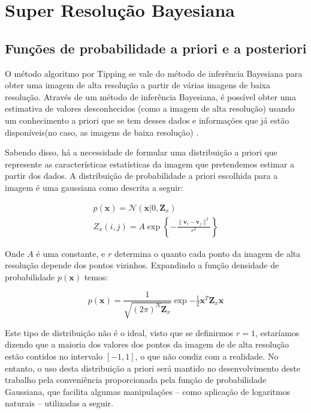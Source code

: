 \documentclass[12pt,openright,oneside,a4paper,english,brazil]{abntex2}
\begin{document}
\chapter{Super Resolução Bayesiana}
\section{Funções de probabilidade a priori e a posteriori}

O método algoritmo por Tipping se vale do método de inferência Bayesiana para obter uma imagem de alta resolução a partir de várias imagens de baixa resolução.
Através de um método de inferência Bayesiana, é possível obter uma estimativa de valores desconhecidos (como a imagem de alta resolução) usando um conhecimento a priori que se tem desses dados e informações que já estão disponíveis(no caso, as imagens de baixa resolução) \cite{therrien2011probability}.

Sabendo disso, há a necessidade de formular uma distribuição a priori que represente as características estatísticas da imagem que pretendemos estimar a partir dos dados.
A distribuição de probabilidade a priori escolhida para a imagem é uma gaussiana como descrita a seguir:

\begin{gather}
	p(\mathbf{x}) = \mathcal{N}(\mathbf{x} | 0, \mathbf{Z}_x) \\ 
	Z_x(i,j) = A \exp \left\{ - \frac{\|\mathbf{v}_i - \mathbf{v}_j \|^2}{r^2} \right\}
\end{gather}

Onde $A$ é uma constante, e $r$ determina o quanto cada ponto da imagem de alta resolução depende dos pontos vizinhos.
Expandindo a função densidade de probabilidade $p(\mathbf{x})$ temos:

\begin{equation}
	p(\mathbf{x}) = \frac{1}{\sqrt{(2\pi)^N \mathbf{Z}_x}}\exp{-\tfrac{1}{2} \mathbf{x}^T \mathbf{Z}_x \mathbf{x}}
\end{equation}

Este tipo de distribuição não é o ideal, visto que se definirmos $r=1$, estaríamos dizendo que a maioria dos valores dos pontos da imagem de de alta resolução estão contidos no intervalo $[-1,1]$, o que não condiz com a realidade.
No entanto, o uso desta distribuição a priori será mantido no desenvolvimento deste trabalho pela conveniência proporcionada pela função de probabilidade Gaussiana, que facilita algumas manipulações -- como aplicação de logaritmos naturais --  utilizadas a seguir.
\end{document}
